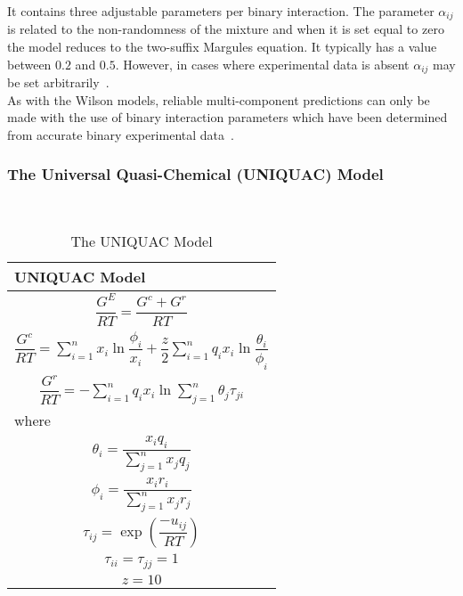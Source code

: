 It contains three adjustable parameters per binary interaction. The parameter $\alpha_{ij}$ is related to the non-randomness of the mixture and when it is set equal to zero the model reduces to the two-suffix Margules equation. It typically has a value between $0.2$ and $0.5$. However, in cases where experimental data is absent $\alpha_{ij}$ may be set arbitrarily~\cite{MolecularThermodynamicsOfFluidPhaseEquilibria}.\\

 As with the Wilson models, reliable multi-component predictions can only be made with the use of binary interaction parameters which have been determined from accurate binary experimental data~\cite{ThermophysicalProperties}.\


\subsubsection{The Universal Quasi-Chemical (UNIQUAC) Model}\

\begin{table}
			\caption{The UNIQUAC Model}\label{UNIQUACTable}
			\begin{center}
			\begin{tabularx}{\textwidth}{Xc}
			\hline
			\textbf{UNIQUAC Model}&\\
			\hline
			\multicolumn{2}{c}{$ \dfrac{G^{E}}{RT} = \dfrac{G^{c}+G^{r}}{RT}$}\\
			\multicolumn{2}{c}{$ \dfrac{G^{c}}{RT} = \sum_{i=1}^{n} x_{i} \ln \dfrac{\phi_{i}}{x_{i}} + \dfrac{z}{2}\sum_{i=1}^{n}q_{i}x_{i}\ln \dfrac{\theta_{i}}{\phi_{i}}$}\\
			\multicolumn{2}{c}{$ \dfrac{G^{r}}{RT} = -\sum_{i=1}^{n}q_{i}x_{i}\ln \sum_{j=1}^{n}\theta_{j} \tau_{ji}$}\\
			where&\\
			\multicolumn{2}{c}{$ \theta_{i} = \dfrac{x_{i}q_{i}}{\sum_{j=1}^{n}x_{j}q_{j}}$}\\
			\multicolumn{2}{c}{$ \phi_{i} = \dfrac{x_{i}r_{i}}{\sum_{j=1}^{n}x_{j}r_{j}}$}\\
			\multicolumn{2}{c}{$ \tau_{ij} = \exp\left(\dfrac{-u_{ij}}{RT}\right)$}\\
			\multicolumn{2}{c}{$\tau_{ii}= \tau_{jj} = 1$}\\			
			\multicolumn{2}{c}{$z = 10$}\\			
			\hline
			\end{tabularx}
			\end{center}
\end{table}

